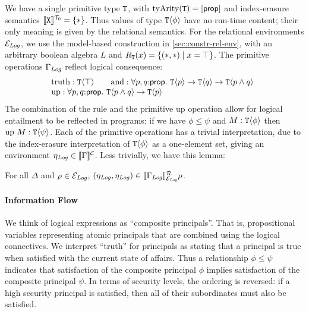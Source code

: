 We have a single primitive type $\textup{\texttt{T}}$, with
$\mathrm{tyArity}(\textup{\texttt{T}}) = [\mathsf{prop}]$ and index-erasure
semantics $\llbracket \textup{\texttt{X}} \rrbracket^{\mathcal{T}_0} = \{ * \}$. Thus values of type
$\textup{\texttt{T}}\langle \phi \rangle$ have no run-time content; their only meaning is
given by the relational semantics. For the relational environments
$\mathcal{E}_{\mathit{Log}}$, we use the model-based construction in
\autoref{sec:constr-rel-env}, with an arbitrary boolean algebra $L$
and $R_{\textup{\texttt{T}}}(x) = \{ (*,*) \mathrel| x = \top \}$.  The
primitive operations $\Gamma_{\mathit{Log}}$ reflect logical consequence:
\begin{displaymath}
  \begin{array}{l}
  \begin{array}{@{}c@{\hspace{2em}}c}
    \mathrm{truth} : \tyPrim{T}{\top} &
    \mathrm{and}   : \forall p, q\mathord:\mathsf{prop}.\ \tyPrim{T}{p} \to \tyPrim{T}{q} \to \tyPrim{T}{p \land q}
  \end{array} \\
  \mathrm{up} : \forall p, q\mathord:\mathsf{prop}.\ \tyPrim{T}{p \land q} \to \tyPrim{T}{p}
\end{array}
\end{displaymath}
The combination of the  rule and the primitive
$\mathrm{up}$ operation allow for logical entailment to be reflected
in programs: if we have $\phi \leq \psi$ and $M : \textup{\texttt{T}}\langle \phi \rangle$
then $\mathrm{up}\ M : \textup{\texttt{T}}\langle \psi \rangle$. Each of the primitive
operations has a trivial interpretation, due to the index-erasure
interpretation of $\textup{\texttt{T}}\langle \phi \rangle$ as a one-element set, giving an
environment $\eta_{\mathit{Log}} \in \llbracket \Gamma \rrbracket^{\mathcal{C}}$. Less trivially, we
have this lemma:
\begin{lemma}\label{lem:environments-information-flow}
  For all $\Delta$ and $\rho \in \mathcal{E}_{\mathit{Log}}$, $(\eta_{\mathit{Log}}, \eta_{\mathit{Log}}) \in \llbracket \Gamma_{\mathit{Log}} \rrbracket^{\mathcal{R}}_{\mathcal{E}_{\mathit{Log}}}{\rho}$.
\end{lemma}

\paragraph{Information Flow} We think of logical expressions as
``composite principals''. That is, propositional variables representing
atomic principals that are combined using the logical connectives. We
interpret ``truth'' for principals as stating that a principal is true
when satisfied with the current state of affairs. Thus a relationship
$\phi \leq \psi$ indicates that satisfaction of the composite
principal $\phi$ implies satisfaction of the composite principal
$\psi$. In terms of security levels, the ordering is reversed: if a
high security principal is satisfied, then all of their subordinates
must also be satisfied.

